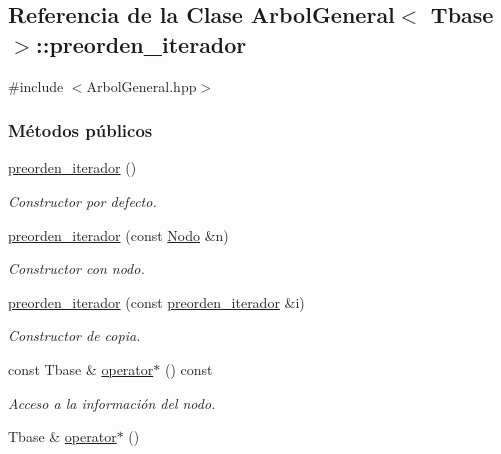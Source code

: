 \hypertarget{classArbolGeneral_1_1preorden__iterador}{\subsection{Referencia de la Clase Arbol\-General$<$ Tbase $>$\-:\-:preorden\-\_\-iterador}
\label{classArbolGeneral_1_1preorden__iterador}
}


{\ttfamily \#include $<$Arbol\-General.\-hpp$>$}

\subsubsection*{Métodos públicos}
\begin{DoxyCompactItemize}
\item 
\hyperlink{classArbolGeneral_1_1preorden__iterador_a1ad7d0b716beb169de08516187b002e4}{preorden\-\_\-iterador} ()
\begin{DoxyCompactList}\small\item\em Constructor por defecto. \end{DoxyCompactList}\item 
\hyperlink{classArbolGeneral_1_1preorden__iterador_a3b2071c95cde719c132e53f1a8838bdb}{preorden\-\_\-iterador} (const \hyperlink{classArbolGeneral_a12cc1b74a9095d89bc7334290d332f7a}{Nodo} \&n)
\begin{DoxyCompactList}\small\item\em Constructor con nodo. \end{DoxyCompactList}\item 
\hyperlink{classArbolGeneral_1_1preorden__iterador_a4d412bb22cc8e2aebcb2bbefb0b78a4b}{preorden\-\_\-iterador} (const \hyperlink{classArbolGeneral_1_1preorden__iterador}{preorden\-\_\-iterador} \&i)
\begin{DoxyCompactList}\small\item\em Constructor de copia. \end{DoxyCompactList}\item 
const Tbase \& \hyperlink{classArbolGeneral_1_1preorden__iterador_a1c05242e721803c34510916d04968f54}{operator$\ast$} () const 
\begin{DoxyCompactList}\small\item\em Acceso a la información del nodo. \end{DoxyCompactList}\item 
Tbase \& \hyperlink{classArbolGeneral_1_1preorden__iterador_a2336e1008cac3a859337da8fc24075d0}{operator$\ast$} ()

\end{DoxyCompactItemize}
